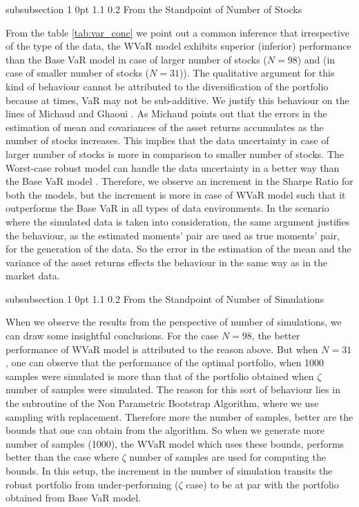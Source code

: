 \documentclass[12pt]{article}
\makeatletter
\numberwithin{equation}{section}
\renewcommand{\subsubsection}{
  \@startsection
  {subsubsection}%
  {1}%
  {0pt}%
  {1.1\baselineskip}%
  {0.2\baselineskip}%
  {\sc \centering}%
}
\makeatother
\begin{document}
\subsubsection{From the Standpoint of Number of Stocks}

From the table \ref{tab:var_conc} we point out a common inference that irrespective of the type of the data, the WVaR model exhibits superior (inferior) performance than the Base VaR model in case of larger number of stocks ($N=98$) and (in case of smaller number of stocks ($N=31$)). The qualitative argument for this kind of behaviour cannot be attributed to the diversification of the portfolio because at times, VaR may not be sub-additive. We justify this behaviour on the lines of Michaud \cite{Michaud} and Ghaoui \cite{Michaud}. As Michaud points out that the errors in the estimation of mean and covariances of the asset returns accumulates as the number of stocks increases. This implies that the data uncertainty in case of larger number of stocks is more in comparison to smaller number of stocks. The Worst-case robust model can handle the data uncertainty in a better way than the Base VaR model \cite{ghaoui03}. Therefore, we observe an increment in the Sharpe Ratio for both the models, but the increment is more in case of WVaR model such that it outperforms the Base VaR in all types of data environments. In the scenario where the simulated data is taken into consideration, the same argument justifies the behaviour, as the estimated moments' pair are used as true moments' pair, for the generation of the data. So the error in the estimation of the mean and the variance of the asset returns effects the behaviour in the same way as in the market data.

\subsubsection{From the Standpoint of Number of Simulations}

When we observe the results from the perspective of number of simulations, we can draw some insightful conclusions. For the case $N=98$, the better performance of WVaR model is attributed to the reason above. But when $N=31$, one can observe that the performance of the optimal portfolio, when 1000 samples were simulated is more than that of the portfolio obtained when $\zeta$ number of samples were simulated. The reason for this sort of behaviour lies in the subroutine of the Non Parametric Bootstrap Algorithm, where we use sampling with replacement. Therefore more the number of samples, better are the bounds that one can obtain from the algorithm. So when we generate more number of samples (1000), the WVaR model which uses these bounds, performs better than the case where $\zeta$ number of samples are used for computing the bounds. In this setup, the increment in the number of simulation transits the robust portfolio from under-performing ($\zeta$ case) to be at par with the portfolio obtained from Base VaR model.
\end{document}
